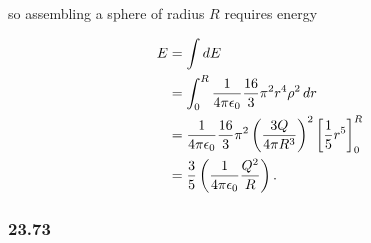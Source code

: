 \documentclass{article}
\begin{document}
so assembling a sphere of radius $R$ requires energy

\begin{align*}
  E & = \int dE                                                                                          \\
    & = \int_0^R \frac{1}{4 \pi \epsilon_0} \frac{16}{3} \pi^2 r^4 \rho^2 \,dr                                                  \\
    & = \frac{1}{4 \pi \epsilon_0} \frac{16}{3} \pi^2 \left( \frac{3 Q}{4 \pi R^3} \right)^2 \left[ \frac{1}{5} r^5 \right]_0^R \\
    & = \frac{3}{5} \left( \frac{1}{4 \pi \epsilon_0} \frac{Q^2}{R} \right).
\end{align*}

\subsubsection{23.73}
\end{document}
